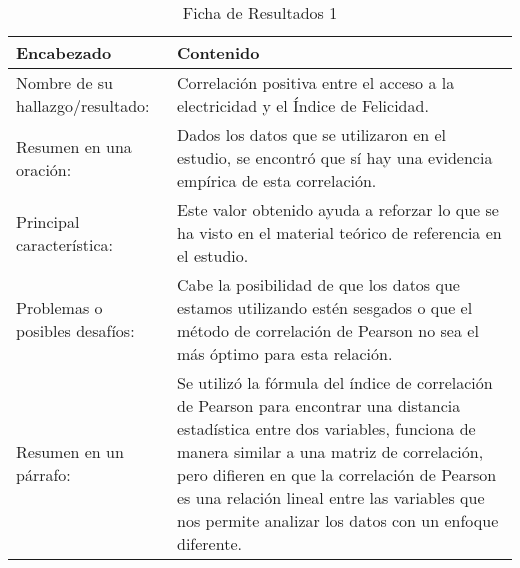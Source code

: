 \begin{table}[H]
    \caption{Ficha de Resultados 1}
    \begin{center}
        \begin{tabular}{  m{3cm} | m{12cm}  }
        \hline
        \textbf{ Encabezado} & \textbf{Contenido }\\ 
        \hline
        Nombre de su hallazgo/resultado: & Correlación positiva entre el acceso a la electricidad y el Índice de Felicidad.\\ 
        \hline
        Resumen en una oración: & Dados los datos que se utilizaron en el estudio, se encontró que sí hay una evidencia empírica de esta correlación.\\ 
        \hline
        Principal característica: & Este valor obtenido ayuda a reforzar lo que se ha visto en el material teórico de referencia en el estudio.\\ 
        \hline
        Problemas o posibles desafíos: &  Cabe la posibilidad de que los datos que estamos utilizando estén sesgados o que el método de correlación de Pearson no sea el más óptimo para esta relación. \\ \hline
        Resumen en un párrafo: & Se utilizó la fórmula del índice de correlación de Pearson para encontrar una distancia estadística entre dos variables, funciona de manera similar a una matriz de correlación, pero difieren en que la correlación de Pearson es una relación lineal entre las variables que nos permite analizar los datos con un enfoque diferente. \\ 
        \hline
        \end{tabular}
    \end{center}
\end{table}

